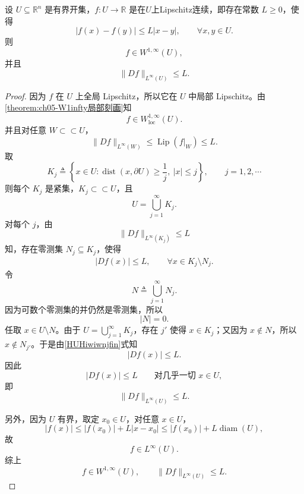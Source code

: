 \documentclass[../../main.tex]{subfiles}
\begin{document}
\begin{corollary}
\label{corollary:ch05-Lipschitz-W1infty}
设 \(U\subseteq\mathbb R^n\) 是有界开集，\(f:U\to\mathbb R\) 是在$U$上Lipschitz连续，即存在常数 \(L\geqslant0\)，使得
\[
|f(x)-f(y)|\leqslant L|x-y|,
\qquad
\forall x,y\in U.
\]
则
\[
f\in W^{1,\infty}(U),
\]
并且
\[
\|Df\|_{L^\infty(U)}\leqslant L.
\]
\end{corollary}
\begin{proof}

因为 \(f\) 在 \(U\) 上全局 Lipschitz，所以它在 \(U\) 中局部 Lipschitz。由\cref{theorem:ch05-W1infty局部刻画}知
\[
f\in W^{1,\infty}_{\mathrm{loc}}(U).
\]
并且对任意 \(W\subset\subset U\)，
\[
\|Df\|_{L^\infty(W)}
\leqslant
\operatorname{Lip}(f|_W)
\leqslant L.
\]
取
\[
K_j
\triangleq
\left\{
x\in U:
\operatorname{dist}(x,\partial U)\geqslant\frac1j,\ 
|x|\leqslant j
\right\},
\qquad
j=1,2,\cdots
\]
则每个 \(K_j\) 是紧集，\(K_j\subset\subset U\)，且
\[
U=\bigcup_{j=1}^{\infty}K_j.
\]
对每个 \(j\)，由
\[
\|Df\|_{L^\infty(K_j)}\leqslant L
\]
知，存在零测集 \(N_j\subseteq K_j\)，使得
\begin{align}
|Df(x)|\leqslant L,
\qquad
\forall x\in K_j\setminus N_j.\label{HUHiwiwnjfin}
\end{align}
令
\[
N\triangleq\bigcup_{j=1}^{\infty}N_j.
\]
因为可数个零测集的并仍然是零测集，所以
\[
|N|=0.
\]
任取 \(x\in U\setminus N\)。由于 \(U=\bigcup_{j=1}^\infty K_j\)，存在 \(j'\) 使得 \(x\in K_j\)；又因为 \(x\notin N\)，所以 \(x\notin N_{j'}\)。于是由\eqref{HUHiwiwnjfin}式知
\[
|Df(x)|\leqslant L.
\]
因此
\[
|Df(x)|\leqslant L
\qquad
\text{对几乎一切 }x\in U,
\]
即
\[
\|Df\|_{L^\infty(U)}\leqslant L.
\]

另外，因为 \(U\) 有界，取定 \(x_0\in U\)，对任意 \(x\in U\)，
\[
|f(x)|
\leqslant
|f(x_0)|+L|x-x_0|
\leqslant
|f(x_0)|+L\operatorname{diam}(U),
\]
故
\[
f\in L^\infty(U).
\]
综上
\[
f\in W^{1,\infty}(U),\qquad \|Df\|_{L^\infty(U)}\leqslant L.
\]
\end{proof}
\end{document}
